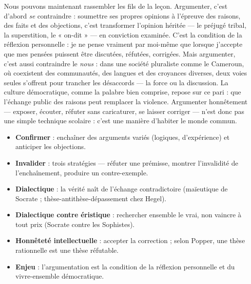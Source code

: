 \documentclass[11pt]{article}
\newcommand{\cle}[1]{{\popxbold\color{popdark}#1}}
\begin{document}
Nous pouvons maintenant rassembler les fils de la leçon. Argumenter, c'est d'abord \emph{se} contraindre : soumettre ses propres opinions à l'épreuve des raisons, des faits et des objections, c'est transformer l'opinion héritée — le préjugé tribal, la superstition, le « on-dit » — en conviction examinée. C'est la condition de la \cle{réflexion personnelle} : je ne pense vraiment par moi-même que lorsque j'accepte que mes pensées puissent être discutées, réfutées, corrigées. Mais argumenter, c'est aussi contraindre le \emph{nous} : dans une société pluraliste comme le Cameroun, où coexistent des communautés, des langues et des croyances diverses, deux voies seules s'offrent pour trancher les désaccords — la force ou la discussion. La culture démocratique, comme la palabre bien comprise, repose sur ce pari : que l'échange public des raisons peut remplacer la violence. Argumenter honnêtement — exposer, écouter, réfuter sans caricaturer, se laisser corriger — n'est donc pas une simple technique scolaire : c'est une manière d'habiter le monde commun.

\begin{aretenir}
\begin{itemize}
\item \textbf{Confirmer} : enchaîner des arguments variés (logiques, d'expérience) et anticiper les objections.
\item \textbf{Invalider} : trois stratégies — réfuter une prémisse, montrer l'invalidité de l'enchaînement, produire un contre-exemple.
\item \textbf{Dialectique} : la vérité naît de l'échange contradictoire (maïeutique de Socrate ; thèse-antithèse-dépassement chez Hegel).
\item \textbf{Dialectique contre éristique} : rechercher ensemble le vrai, non vaincre à tout prix (Socrate contre les Sophistes).
\item \textbf{Honnêteté intellectuelle} : accepter la correction ; selon Popper, une thèse rationnelle est une thèse réfutable.
\item \textbf{Enjeu} : l'argumentation est la condition de la réflexion personnelle et du vivre-ensemble démocratique.
\end{itemize}
\end{aretenir}
\end{document}
